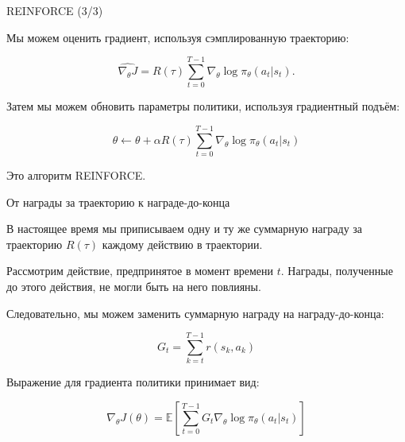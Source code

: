 \documentclass{beamer}
\begin{document}
	\begin{frame}{REINFORCE (3/3)}
		\begin{flushleft}
			
			Мы можем оценить градиент, используя сэмплированную траекторию:
			
			\[
			\widehat{\nabla_\theta J}
			=
			R(\tau)
			\sum_{t=0}^{T-1}
			\nabla_\theta\log\pi_\theta(a_t|s_t).
			\]
			
			Затем мы можем обновить параметры политики, используя
			градиентный подъём:
			
			\[
			\boxed{
				\theta
				\leftarrow
				\theta+
				\alpha R(\tau)
				\sum_{t=0}^{T-1}
				\nabla_\theta\log\pi_\theta(a_t|s_t)
			}
			\]
			
			Это алгоритм REINFORCE.
			
		\end{flushleft}
	\end{frame}
	
	\begin{frame}{От награды за траекторию к награде-до-конца}
		\begin{flushleft}
			{\small 
			В настоящее время мы приписываем одну и ту же суммарную награду
			за траекторию $R(\tau)$ каждому действию в траектории.
			
			Рассмотрим действие, предпринятое в момент времени $t$.
			Награды, полученные до этого действия, не могли быть
			на него повлияны.
			
			Следовательно, мы можем заменить суммарную награду на
			награду-до-конца:
			
			\[
			\boxed{
				G_t=\sum_{k=t}^{T-1}r(s_k,a_k)
			}
			\]
			
			Выражение для градиента политики принимает вид:
			
			\[
			\boxed{
				\nabla_\theta J(\theta)
				=
				\mathbb{E}
				\left[
				\sum_{t=0}^{T-1}
				G_t\nabla_\theta\log\pi_\theta(a_t|s_t)
				\right]
			}
			\]
		}
		\end{flushleft}
	\end{frame}
	
\end{document}
